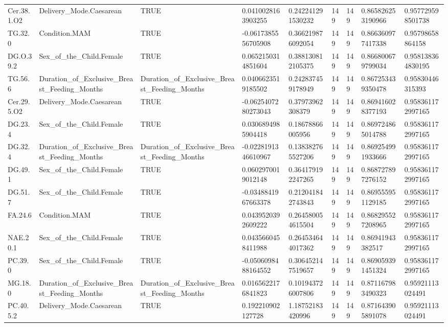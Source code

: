 \begin{longtable}{lllllllll}
Cer.38.1.O2 & Delivery\_Mode.Caesarean & TRUE & 0.0410028163903255 & 0.242241291530232 & 149 & 149 & 0.865826253190966 & 0.957729598501738 \\
TG.32.0 & Condition.MAM & TRUE & -0.0617385556705908 & 0.366219876092054 & 149 & 149 & 0.866360977417338 & 0.95798658864158 \\
DG.O.39.2 & Sex\_of\_the\_Child.Female & TRUE & 0.0652150314851604 & 0.388130812105375 & 149 & 149 & 0.866800679799034 & 0.958138364830195 \\
TG.56.6 & Duration\_of\_Exclusive\_Breast\_Feeding\_Months & Duration\_of\_Exclusive\_Breast\_Feeding\_Months & 0.0406623519185502 & 0.242837459178949 & 149 & 149 & 0.867253439350478 & 0.95830446315393 \\
Cer.29.5.O2 & Delivery\_Mode.Caesarean & TRUE & -0.0625407280273043 & 0.37973962308379 & 149 & 149 & 0.869416028377193 & 0.958361172997165 \\
DG.23.4 & Sex\_of\_the\_Child.Female & TRUE & 0.0306894985904418 & 0.18678866005956 & 149 & 149 & 0.869724865014788 & 0.958361172997165 \\
DG.32.4 & Duration\_of\_Exclusive\_Breast\_Feeding\_Months & Duration\_of\_Exclusive\_Breast\_Feeding\_Months & -0.0228191346610967 & 0.138382765527206 & 149 & 149 & 0.869254991933666 & 0.958361172997165 \\
DG.49.1 & Sex\_of\_the\_Child.Female & TRUE & 0.0602970019012148 & 0.364179192247265 & 149 & 149 & 0.868727897276152 & 0.958361172997165 \\
DG.51.7 & Sex\_of\_the\_Child.Female & TRUE & -0.0348841967663378 & 0.212041842743843 & 149 & 149 & 0.869555951129185 & 0.958361172997165 \\
FA.24.6 & Condition.MAM & TRUE & 0.0439520392609222 & 0.264580054615504 & 149 & 149 & 0.868295527208965 & 0.958361172997165 \\
NAE.20.1 & Sex\_of\_the\_Child.Female & TRUE & 0.0435660458411988 & 0.264534644017362 & 149 & 149 & 0.86941943382517 & 0.958361172997165 \\
PC.39.0 & Sex\_of\_the\_Child.Female & TRUE & -0.0506098488164552 & 0.306452147519657 & 149 & 149 & 0.869059391451324 & 0.958361172997165 \\
MG.18.0 & Duration\_of\_Exclusive\_Breast\_Feeding\_Months & Duration\_of\_Exclusive\_Breast\_Feeding\_Months & 0.0165622176841823 & 0.101943726007806 & 149 & 149 & 0.871167983490323 & 0.95921113024491 \\
PC.40.5.2 & Delivery\_Mode.Caesarean & TRUE & 0.192210902127728 & 1.18752183420996 & 149 & 149 & 0.871643905891078 & 0.95921113024491 \\

\end{longtable}
